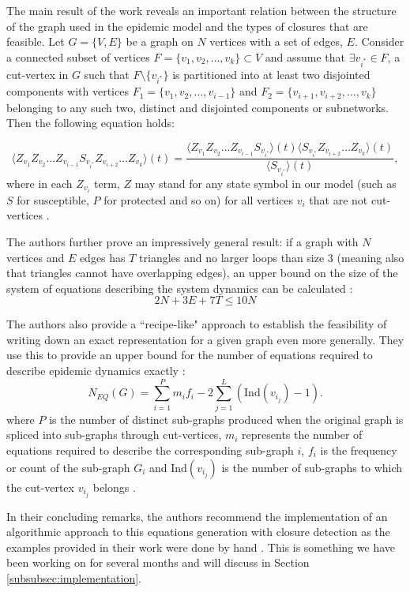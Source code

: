 \documentclass[../report.tex]{subfiles}
\begin{document}
The main result of the work reveals an important relation between the structure of the graph used in the epidemic model and the types of closures that are feasible. Let $G = \{V, E\}$ be a graph on $N$ vertices with a set of edges, $E$. Consider a connected subset of vertices $F = \{v_1, v_2, \dots, v_k\} \subset V$ and assume that $\exists v_{i^*} \in F$, a cut-vertex in $G$ such that $F \setminus \{ v_{i^*} \}$ is partitioned into at least two disjointed components with vertices $F_1 = \{ v_1, v_2, \dots, v_{i-1} \}$ and $F_2 = \{ v_{i+1}, v_{i+2}, \dots, v_k \}$ belonging to any such two, distinct and disjointed components or subnetworks. Then the following equation holds:

$$
\langle Z_{v_1} Z_{v_2} \dots Z_{v_{i-1}} S_{v_{i^*}} Z_{v_{i+2}} \dots Z_{v_k} \rangle (t) = \frac{\langle Z_{v_1} Z_{v_2} \dots Z_{v_{i-1}} S_{v_{i^*}} \rangle (t) \langle S_{v_{i^*}} Z_{v_{i+2}} \dots Z_{v_k} \rangle (t)}{\langle S_{v_{i^*}} \rangle (t)},
$$
where in each $Z_{v_i}$ term, $Z$ may stand for any state symbol in our model (such as $S$ for susceptible, $P$ for protected and so on) for all vertices $v_i$ that are not cut-vertices \cite{kiss_2014}.

The authors further prove an impressively general result: if a graph with $N$ vertices and  $E$ edges has $T$ triangles and no larger loops than size 3 (meaning also that triangles cannot have overlapping edges), an upper bound on the size of the system of equations describing the system dynamics can be calculated \cite{kiss_2014}:
$$
2N + 3E + 7T \leq 10N
$$

The authors also provide a ``recipe-like" approach to establish the feasibility of writing down an exact representation for a given graph even more generally. They use this to provide an upper bound for the number of equations required to describe epidemic dynamics exactly \cite{kiss_2014}:
$$
\displaystyle N_{EQ}(G)=\sum^P_{i=1}m_if_i - 2\sum^{L}_{j=1}(\text{Ind}(v_{i_j})-1).
$$
where $P$ is the number of distinct sub-graphs produced when the original graph is spliced into sub-graphs through cut-vertices, $m_i$ represents the number of equations required to describe the corresponding sub-graph $i$, $f_i$ is the frequency or count of the sub-graph $G_i$ and $\text{Ind}(v_{i_j})$ is the number of sub-graphs to which the cut-vertex $v_{i_j}$ belongs \cite{kiss_2014}.

In their concluding remarks, the authors recommend the implementation of an algorithmic approach to this equations generation with closure detection as the examples provided in their work were done by hand \cite{kiss_2014}. This is something we have been working on for several months and will discuss in Section \ref{subsubsec:implementation}. 
\end{document}
